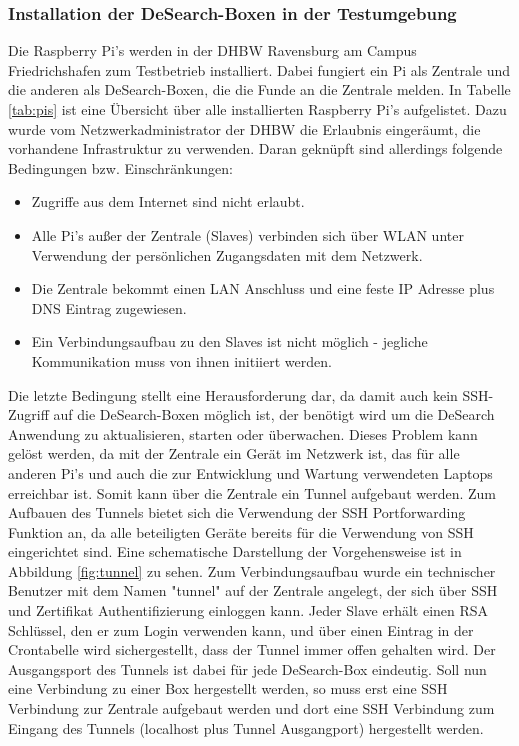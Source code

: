 \subsubsection{Installation der DeSearch-Boxen in der Testumgebung}
Die Raspberry Pi's werden in der DHBW Ravensburg am Campus Friedrichshafen zum Testbetrieb installiert. Dabei fungiert ein Pi als Zentrale und die anderen als DeSearch-Boxen, die die Funde an die Zentrale melden. In Tabelle \ref{tab:pis} ist eine Übersicht über alle installierten Raspberry Pi's aufgelistet.
Dazu wurde vom Netzwerkadministrator der DHBW die Erlaubnis eingeräumt, die vorhandene Infrastruktur zu verwenden. Daran geknüpft sind allerdings folgende Bedingungen bzw. Einschränkungen:
\begin{itemize}
	\item Zugriffe aus dem Internet sind nicht erlaubt.
	\item Alle Pi's außer der Zentrale (Slaves) verbinden sich über WLAN unter Verwendung der persönlichen Zugangsdaten mit dem Netzwerk.
	\item Die Zentrale bekommt einen LAN Anschluss und eine feste IP Adresse plus DNS Eintrag zugewiesen.
	\item Ein Verbindungsaufbau zu den Slaves ist nicht möglich - jegliche Kommunikation muss von ihnen initiiert werden.
\end{itemize}
Die letzte Bedingung stellt eine Herausforderung dar, da damit auch kein SSH-Zugriff auf die DeSearch-Boxen möglich ist, der benötigt wird um die DeSearch Anwendung zu aktualisieren, starten oder überwachen.
Dieses Problem kann gelöst werden, da mit der Zentrale ein Gerät im Netzwerk ist, das für alle anderen Pi's und auch die zur Entwicklung und Wartung verwendeten Laptops erreichbar ist. Somit kann über die Zentrale ein Tunnel aufgebaut werden.
Zum Aufbauen des Tunnels bietet sich die Verwendung der SSH Portforwarding Funktion an, da alle beteiligten Geräte bereits für die Verwendung von SSH eingerichtet sind. Eine schematische Darstellung der Vorgehensweise ist in Abbildung \ref{fig:tunnel} zu sehen.
Zum Verbindungsaufbau wurde ein technischer Benutzer mit dem Namen "tunnel" auf der Zentrale angelegt, der sich über SSH und Zertifikat Authentifizierung einloggen kann.
Jeder Slave erhält einen RSA Schlüssel, den er zum Login verwenden kann, und über einen Eintrag in der Crontabelle wird sichergestellt, dass der Tunnel immer offen gehalten wird.
Der Ausgangsport des Tunnels ist dabei für jede DeSearch-Box eindeutig. Soll nun eine Verbindung zu einer Box hergestellt werden, so muss erst eine SSH Verbindung zur Zentrale aufgebaut werden und dort eine SSH Verbindung zum Eingang des Tunnels (localhost plus Tunnel Ausgangport) hergestellt werden.
